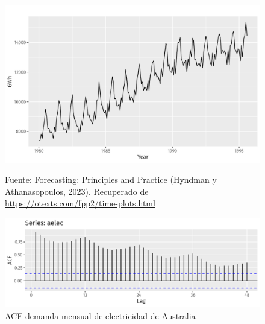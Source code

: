 \begin{itemize}
\begin{figure}[H]
        \begin{minipage}[b]{1.1\textwidth}
            \centering
            \includegraphics[width=\textwidth]{img/aelec-1-ejemplo.png}        
        \end{minipage}
    
        \begin{minipage}[t]{0.9\textwidth}
            Fuente: Forecasting: Principles and Practice (Hyndman y Athanasopoulos, 2023). Recuperado de \url{https://otexts.com/fpp2/time-plots.html}
        \end{minipage}
    \end{figure}

    \begin{figure}[H]
        \begin{minipage}[t]{0.9\textwidth}
            \caption{ACF demanda mensual de electricidad de Australia}
            \label{autocorrelaciones4}        
        \end{minipage}
    
        \vspace{10pt}
    
        \begin{minipage}[b]{1.1\textwidth}
            \centering
            \includegraphics[width=\textwidth]{img/acfelec-1-ejemplo.png}        
        \end{minipage}
    

\end{figure}
\end{itemize}
